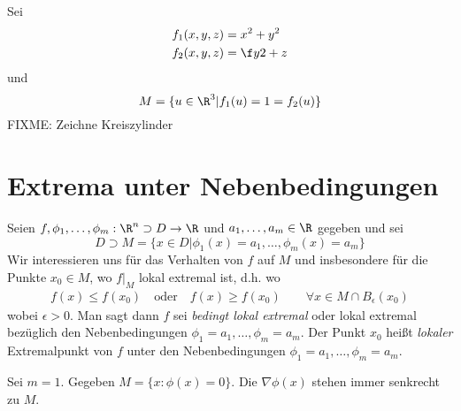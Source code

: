 \documentclass{mycourse}
\begin{document}
\begin{ex*}
	Sei
	\begin{align*}
		f_1(x,y,z) &= x^2 +y^2\\
		f_2(x,y,z) &= \f y2 + z
	\end{align*}
	und
	\[
		M=\{ u\in\R^3 | f_1(u) = 1 = f_2(u)\}
	\]
	FIXME: Zeichne Kreiszylinder
\end{ex*}


\section{Extrema unter Nebenbedingungen}


Seien $f,\phi_1,\dotsc, \phi_m : \R^n \supset D \to \R$ und $a_1,\dotsc,a_m\in \R$ gegeben und sei
\[
	D \supset M = \{x\in D| \phi_1(x) = a_1, \dotsc, \phi_m(x) = a_m\}
\]
Wir interessieren uns für das Verhalten von $f$ auf $M$ und insbesondere für die Punkte $x_0\in M$, wo $f\big|_M$ lokal extremal ist, d.h. wo
\begin{align*}
	f(x) \le f(x_0)\quad \text{oder}\quad f(x) \ge f(x_0)\qquad \forall x\in M\cap B_\epsilon(x_0)
\end{align*}
wobei $\epsilon > 0$.
Man sagt dann $f$ sei \emph{bedingt lokal extremal} oder lokal extremal bezüglich den Nebenbedingungen $\phi_1 = a_1, \dotsc, \phi_m=a_m$.
Der Punkt $x_0$ heißt \emph{lokaler} Extremalpunkt von $f$ unter den Nebenbedingungen $\phi_1=a_1,\dotsc, \phi_m=a_m$.

\begin{ex*}
	Sei $m=1$.
	Gegeben $M = \{x:\phi(x)=0\}$.
	Die $\nabla \phi(x)$ stehen immer senkrecht zu $M$.
	\fixme
\end{ex*}
\end{document}

